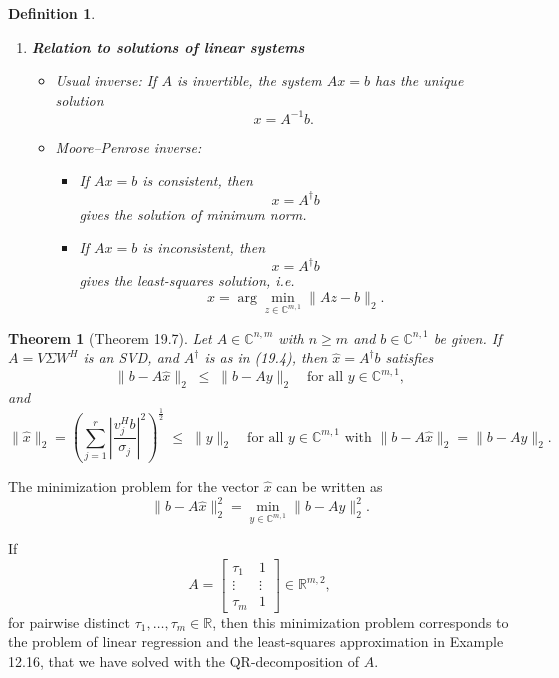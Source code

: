 \documentclass{article}
\newtheorem{theorem}{Theorem}[section] %
\newtheorem{definition}{Definition}[section]
\begin{document}
\begin{definition}
\begin{enumerate}
    \item \textbf{Relation to solutions of linear systems}
    \begin{itemize}
        \item \emph{Usual inverse:}  
        If $A$ is invertible, the system $Ax = b$ has the unique solution
        \[
        x = A^{-1} b.
        \]
        \item \emph{Moore--Penrose inverse:}  
        \begin{itemize}
            \item If $Ax=b$ is consistent, then
            \[
            x = A^{\dagger} b
            \]
            gives the solution of minimum norm.
            \item If $Ax=b$ is inconsistent, then
            \[
            x = A^{\dagger} b
            \]
            gives the least-squares solution, i.e.
            \[
            x = \arg\min_{z \in \mathbb{C}^{m,1}} \|Az - b\|_2.
            \]
        \end{itemize}
    \end{itemize}
\end{enumerate}


    
\end{definition}

\vspace{1cm}

\begin{theorem}[Theorem 19.7]

    Let $A \in \mathbb{C}^{n,m}$ with $n \geq m$ and $b \in \mathbb{C}^{n,1}$ be given.  
If $A = V \Sigma W^H$ is an SVD, and $A^{\dagger}$ is as in (19.4), then 
$\hat{x} = A^{\dagger} b$ satisfies
\[
\| b - A\hat{x} \|_2 \;\leq\; \| b - Ay \|_2 
\quad \text{for all } y \in \mathbb{C}^{m,1},
\]
and
\[
\| \hat{x} \|_2
= \left( \sum_{j=1}^r 
\left| \frac{v_j^H b}{\sigma_j} \right|^2
\right)^{\tfrac{1}{2}}
\;\leq\; \| y \|_2
\quad \text{for all } y \in \mathbb{C}^{m,1} 
\text{ with } \| b - A\hat{x} \|_2 = \| b - Ay \|_2 .
\]

    
\end{theorem}

\vspace{3cm}

The minimization problem for the vector $\hat{x}$ can be written as
\[
\| b - A\hat{x} \|_2^2 
= \min_{y \in \mathbb{C}^{m,1}} \| b - Ay \|_2^2.
\]

If
\[
A =
\begin{bmatrix}
\tau_1 & 1 \\
\vdots & \vdots \\
\tau_m & 1
\end{bmatrix}
\in \mathbb{R}^{m,2},
\]
for pairwise distinct $\tau_1, \ldots, \tau_m \in \mathbb{R}$, then this minimization 
problem corresponds to the problem of linear regression and the least-squares 
approximation in Example 12.16, that we have solved with the QR-decomposition 
of $A$.
\end{document}
